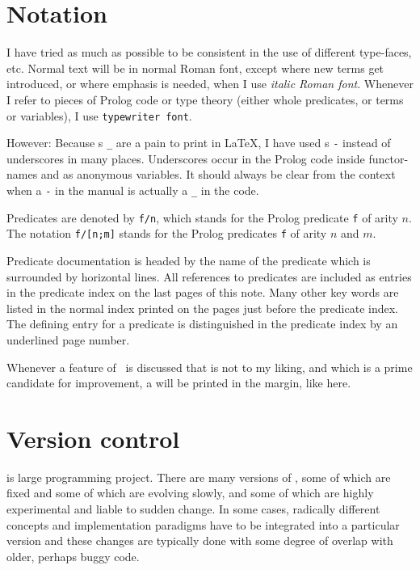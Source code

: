 \section {Notation}

 I have tried as much as possible to be consistent in
the use of different type-faces, etc. Normal text will be in normal
Roman font, except where new terms get introduced, or where emphasis
is needed, when I use {\em italic Roman font}.  Whenever I refer to
pieces of Prolog code or type theory (either whole predicates, or
terms or variables), I use {\tt typewriter font}.

However: Because s {\tt \_} are a pain to print in
\LaTeX, I have used s {\tt -} instead of underscores in
many places. Underscores occur in the Prolog code inside functor-names
and as anonymous variables. It should always be clear from the context
when a {\tt -} in the manual is actually a {\tt \_} in the code.

Predicates are denoted by {\tt f/n}, which stands for the Prolog
predicate {\tt f} of arity $n$. The notation {\tt f/[n;m]} stands for
the Prolog predicates {\tt f} of arity $n$ and $m$.

Predicate documentation is headed by the name of the predicate which
is surrounded by horizontal lines. All references to predicates are
included as entries in the predicate index on the last pages of this
note.  Many other key words are listed in the normal index printed on
the pages just before the predicate index. The defining entry for a
predicate is distinguished in the predicate index by an underlined
page number.

Whenever a feature of \clam\ is discussed that is not to my liking,
and which is a prime candidate for improvement, a 
\notnice will be printed in the margin, like here.

\section {Version control}
\clam{} is large programming project.  There are many versions of
\clam, some of which are fixed and some of which are evolving slowly,
and some of which are highly experimental and liable to sudden
change.  In some cases, radically different concepts and
implementation paradigms have to be integrated into a particular
\clam{} version and these changes are typically done with some degree
of overlap with older, perhaps buggy code. 

